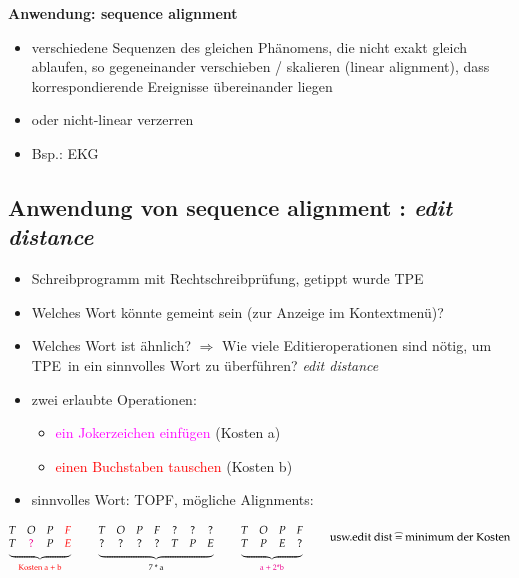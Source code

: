 \documentclass[11pt, fleqn]{scrreprt}
\begin{document}
	\textbf{Anwendung: sequence alignment}
	\begin{itemize}
		\item verschiedene Sequenzen des gleichen Phänomens, die nicht exakt gleich ablaufen, so gegeneinander verschieben / skalieren (linear alignment), dass korrespondierende Ereignisse übereinander liegen
		\item oder nicht-linear verzerren
		\item Bsp.: EKG
	\end{itemize}

	\subsection*{Anwendung von sequence alignment : \emph{edit distance}}
	\begin{itemize}
		\item Schreibprogramm mit Rechtschreibprüfung, getippt wurde \glqq TPE\grqq
		\item Welches Wort könnte gemeint sein (zur Anzeige im Kontextmenü)?
		\item Welches Wort ist ähnlich? $\Rightarrow$ Wie viele Editieroperationen sind nötig, um \glqq TPE\grqq \ in ein sinnvolles Wort zu überführen? \emph{edit distance}
		\item zwei erlaubte Operationen:
		\begin{itemize}
			\item \textcolor{magenta}{ein Jokerzeichen einfügen} (Kosten a)
			\item \textcolor{red}{einen Buchstaben tauschen} (Kosten b)
		\end{itemize}
		\item sinnvolles Wort: \glqq TOPF\grqq , mögliche Alignments:
	\end{itemize}
	\[ \underbrace{\begin{matrix}
	T & O & P & \textcolor{red}{F} \\
	T & \textcolor{magenta}{?} & P & \textcolor{red}{E}
	\end{matrix}}_{\text{\textcolor{red}{Kosten a + b}}}\hspace*{0.8cm}  \underbrace{\begin{matrix} T & O & P & F & ? & ? & ? \\ ? & ? & ? & ? & T & P & E \end{matrix}}_{\text{7 * a}} \hspace*{0.8cm} \underbrace{\begin{matrix} T & O & P & F \\ T & P & E & ? \end{matrix}}_{\text{\textcolor{magenta}{a + 2*b}}} \hspace*{0.8cm} \text{usw.\\ edit dist } \widehat{=} \text{ minimum der Kosten}\]
\end{document}
